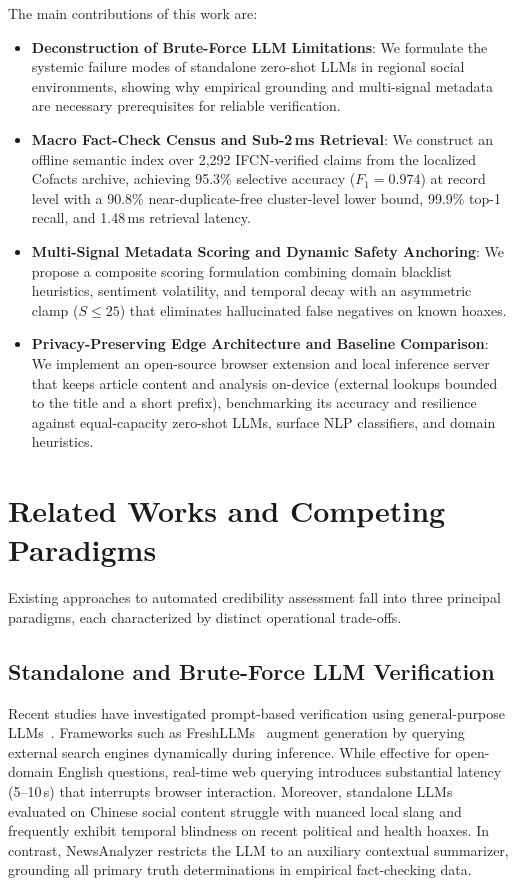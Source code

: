 \documentclass[twoside]{llncs}
\begin{document}
The main contributions of this work are:
\begin{itemize}\setlength{\itemsep}{2pt}
  \item \textbf{Deconstruction of Brute-Force LLM Limitations}: We formulate the systemic failure modes of standalone zero-shot LLMs in regional social environments, showing why empirical grounding and multi-signal metadata are necessary prerequisites for reliable verification.
  \item \textbf{Macro Fact-Check Census and Sub-2\,ms Retrieval}: We construct an offline semantic index over 2,292 IFCN-verified claims from the localized Cofacts archive, achieving 95.3\% selective accuracy ($F_1 = 0.974$) at record level with a 90.8\% near-duplicate-free cluster-level lower bound, 99.9\% top-1 recall, and 1.48\,ms retrieval latency.
  \item \textbf{Multi-Signal Metadata Scoring and Dynamic Safety Anchoring}: We propose a composite scoring formulation combining domain blacklist heuristics, sentiment volatility, and temporal decay with an asymmetric clamp ($S \le 25$) that eliminates hallucinated false negatives on known hoaxes.
  \item \textbf{Privacy-Preserving Edge Architecture and Baseline Comparison}: We implement an open-source browser extension and local inference server that keeps article content and analysis on-device (external lookups bounded to the title and a short prefix), benchmarking its accuracy and resilience against equal-capacity zero-shot LLMs, surface NLP classifiers, and domain heuristics.
\end{itemize}

\section{Related Works and Competing Paradigms}

Existing approaches to automated credibility assessment fall into three principal paradigms, each characterized by distinct operational trade-offs.

\subsection{Standalone and Brute-Force LLM Verification}
Recent studies have investigated prompt-based verification using general-purpose LLMs~\cite{guo2022survey, chern2023factool}. Frameworks such as FreshLLMs~\cite{vu2024freshllms} augment generation by querying external search engines dynamically during inference. While effective for open-domain English questions, real-time web querying introduces substantial latency (5--10\,s) that interrupts browser interaction. Moreover, standalone LLMs evaluated on Chinese social content struggle with nuanced local slang and frequently exhibit temporal blindness on recent political and health hoaxes. In contrast, NewsAnalyzer restricts the LLM to an auxiliary contextual summarizer, grounding all primary truth determinations in empirical fact-checking data.
\end{document}
